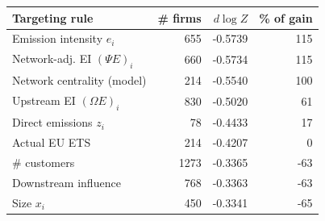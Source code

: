\begin{tabular}{lrrr}
\toprule
Targeting rule & \# firms & $d\log Z$ & \% of gain \\
\midrule
Emission intensity $e_i$ & 655 & -0.5739 & 115 \\
Network-adj. EI $(\Psi E)_i$ & 660 & -0.5734 & 115 \\
Network centrality (model) & 214 & -0.5540 & 100 \\
Upstream EI $(\Omega E)_i$ & 830 & -0.5020 & 61 \\
Direct emissions $z_i$ & 78 & -0.4433 & 17 \\
Actual EU ETS & 214 & -0.4207 & 0 \\
\# customers & 1273 & -0.3365 & -63 \\
Downstream influence & 768 & -0.3363 & -63 \\
Size $x_i$ & 450 & -0.3341 & -65 \\
\bottomrule
\end{tabular}
